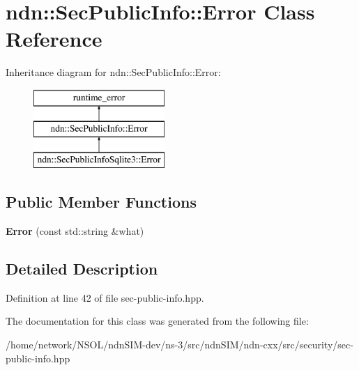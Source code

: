 \hypertarget{classndn_1_1SecPublicInfo_1_1Error}{}\section{ndn\+:\+:Sec\+Public\+Info\+:\+:Error Class Reference}
\label{classndn_1_1SecPublicInfo_1_1Error}
Inheritance diagram for ndn\+:\+:Sec\+Public\+Info\+:\+:Error\+:\begin{figure}[H]
\begin{center}
\leavevmode
\includegraphics[height=3.000000cm]{classndn_1_1SecPublicInfo_1_1Error}
\end{center}
\end{figure}
\subsection*{Public Member Functions}
\begin{DoxyCompactItemize}
\item 
{\bfseries Error} (const std\+::string \&what)\hypertarget{classndn_1_1SecPublicInfo_1_1Error_ad03b9eea05f1b5b74032a0b61117a4a8}{}\label{classndn_1_1SecPublicInfo_1_1Error_ad03b9eea05f1b5b74032a0b61117a4a8}

\end{DoxyCompactItemize}


\subsection{Detailed Description}


Definition at line 42 of file sec-\/public-\/info.\+hpp.



The documentation for this class was generated from the following file\+:\begin{DoxyCompactItemize}
\item 
/home/network/\+N\+S\+O\+L/ndn\+S\+I\+M-\/dev/ns-\/3/src/ndn\+S\+I\+M/ndn-\/cxx/src/security/sec-\/public-\/info.\+hpp\end{DoxyCompactItemize}
